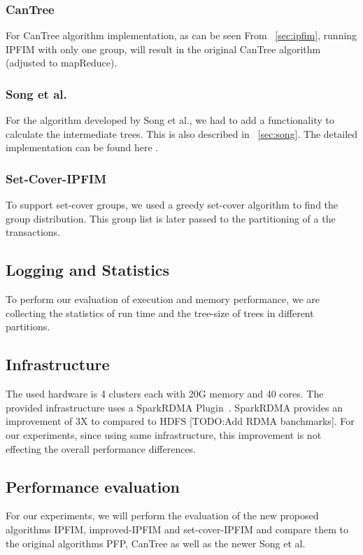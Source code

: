 \subsubsection{CanTree}
For CanTree algorithm implementation, as can be seen From ~\ref{sec:ipfim}, running IPFIM with only one group, will result in the original CanTree algorithm (adjusted to mapReduce).

\subsubsection{Song et al.}
For the algorithm developed by Song et al., we had to add a functionality to calculate the intermediate trees. This is also described in ~\ref{sec:song}. The detailed implementation can be found here .

\subsubsection{Set-Cover-IPFIM}
To support set-cover groups, we used a greedy set-cover algorithm to find the group distribution. This group list is later passed to the partitioning of a the transactions. 

\subsection{Logging and Statistics}
To perform our evaluation of execution and memory performance, we are collecting the statistics of run time and the tree-size of trees in different partitions.

\subsection{Infrastructure}
The used hardware is 4 clusters each with 20G memory and 40 cores. The provided infrastructure uses a SparkRDMA Plugin~\cite{SparkRDMA}. SparkRDMA provides an improvement of 3X to compared to HDFS [TODO:Add RDMA banchmarks]. For our experiments, since using same infrastructure, this improvement is not effecting the overall performance differences. 

\iffalse
This is however in our experiments, using the datasets as different files, while all experiments using same infrastructure, the comparison is valid.  Elaborate in a new section?
\fi

\subsection{Performance evaluation}
For our experiments, we will perform the evaluation of the new proposed algorithms IPFIM, improved-IPFIM and set-cover-IPFIM and compare them to the original algorithms PFP, CanTree as well as the newer Song et al.

